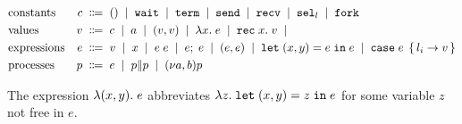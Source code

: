\begin{align*}
  &\text{constants}&
                     c \grmdef & \EUnit \grmor \EkwWait \grmor \EkwTerm \grmor \EkwSend \grmor \EkwRecv \grmor \EkwSelect[l] \grmor \EkwFork \\
  &\text{values}&
                   v \grmdef&
    c                        \grmor
    a                        \grmor
    (v, v)                   \grmor
    \ELam x e                \grmor
    \ERec x v                \grmor
  \\
  &\text{expressions}&
                       e \grmdef&
    v                       \grmor
    x                       \grmor
    e \; e                  \grmor
    \ELetU e e              \grmor
    (e, e)                  \grmor
    \ELetP x y e e          \grmor
         \ECase e { l_i \rightarrow v }
  \\
  & \text{processes}&
  p \grmdef&
    e                       \grmor
    \PPar p p               \grmor
    \PScope p
\end{align*}

The expression $\lambda (x,y).\; e$ abbreviates $\lambda z.\; \mathtt{let}\; (x,y) = z \;\mathtt{in}\; e$
for some variable $z$ not free in $e$.



